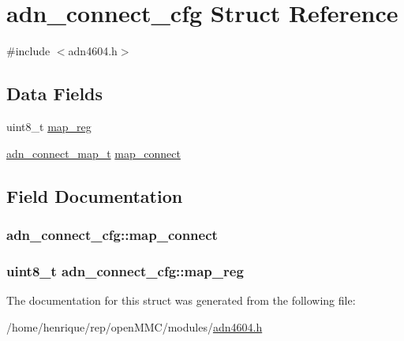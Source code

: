 \hypertarget{structadn__connect__cfg}{\section{adn\-\_\-connect\-\_\-cfg Struct Reference}
\label{structadn__connect__cfg}
}


{\ttfamily \#include $<$adn4604.\-h$>$}

\subsection*{Data Fields}
\begin{DoxyCompactItemize}
\item 
uint8\-\_\-t \hyperlink{structadn__connect__cfg_af1fe413a0609b2b925b641a8aeb1a248}{map\-\_\-reg}
\item 
\hyperlink{adn4604_8h_a85b870d50af8ad573d15fa9737073acc}{adn\-\_\-connect\-\_\-map\-\_\-t} \hyperlink{structadn__connect__cfg_a0c314ea6e82b21f37b8d65ab58cc8cb5}{map\-\_\-connect}
\end{DoxyCompactItemize}


\subsection{Field Documentation}
\hypertarget{structadn__connect__cfg_a0c314ea6e82b21f37b8d65ab58cc8cb5}{
\subsubsection[{map\-\_\-connect}]{ adn\-\_\-connect\-\_\-cfg\-::map\-\_\-connect}}\label{structadn__connect__cfg_a0c314ea6e82b21f37b8d65ab58cc8cb5}
\hypertarget{structadn__connect__cfg_af1fe413a0609b2b925b641a8aeb1a248}{
\subsubsection[{map\-\_\-reg}]{\setlength{\rightskip}{0pt plus 5cm}uint8\-\_\-t adn\-\_\-connect\-\_\-cfg\-::map\-\_\-reg}}\label{structadn__connect__cfg_af1fe413a0609b2b925b641a8aeb1a248}


The documentation for this struct was generated from the following file\-:\begin{DoxyCompactItemize}
\item 
/home/henrique/rep/open\-M\-M\-C/modules/\hyperlink{adn4604_8h}{adn4604.\-h}\end{DoxyCompactItemize}
